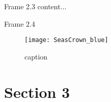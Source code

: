 \documentclass[xcolor=svgnames]{beamer}
\begin{document}
\begin{frame}{Frame 2.3}
	content...
\end{frame}

\begin{frame}{Frame 2.4}
	\begin{figure}[h]
	\centering
	\caption{caption}
	\texttt{[image: SeasCrown\_blue]}
	\end{figure}
\end{frame}

\section{Section 3}

\lastrealframe

\section{}
\usebackgroundtemplate{}
\begin{frame}[plain]
	\titlepage
\end{frame}
\end{document}
